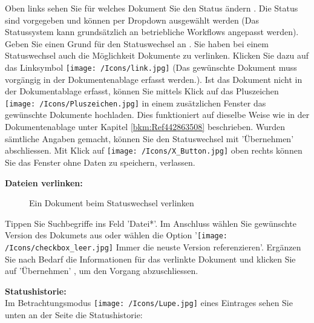 Oben links sehen Sie für welches Dokument Sie den Status ändern . Die Status sind vorgegeben und können per Dropdown ausgewählt werden  (Das Statussystem kann grundsätzlich an betriebliche Workflows angepasst werden). Geben Sie einen Grund für den Statuswechsel an . Sie haben bei einem Statuswechsel auch die Möglichkeit Dokumente zu verlinken. Klicken Sie dazu auf das Linksymbol \texttt{[image: /Icons/link.jpg]}  (Das gewünschte Dokument muss vorgängig in der Dokumentenablage erfasst werden.). Ist das Dokument nicht in der Dokumentablage erfasst, können Sie mittels Klick auf das Pluszeichen \texttt{[image: /Icons/Pluszeichen.jpg]}  in einem zusätzlichen Fenster das gewünschte Dokumente hochladen. Dies funktioniert auf dieselbe Weise wie in der Dokumentenablage unter Kapitel \ref{bkm:Ref442863508} beschrieben. Wurden sämtliche Angaben gemacht, können Sie den Statuswechsel mit 'Übernehmen'  abschliessen. Mit Klick auf \texttt{[image: /Icons/X\_Button.jpg]}  oben rechts können Sie das Fenster ohne Daten zu speichern, verlassen.

\vspace{\baselineskip}

\textbf{Dateien verlinken:}

\begin{figure}[H]
\caption{Ein Dokument beim Statuswechsel verlinken}
\end{figure}

Tippen Sie Suchbegriffe ins Feld 'Datei*'. Im Anschluss wählen Sie gewünschte Version des Dokumets aus oder wählen die Option '\texttt{[image: /Icons/checkbox\_leer.jpg]} Immer die neuste Version referenzieren'. Ergänzen Sie nach Bedarf die Informationen für das verlinkte Dokument und klicken Sie auf 'Übernehmen' , um den Vorgang abzuschliessen.

\vspace{\baselineskip}

\textbf{Statushistorie:}\\
Im Betrachtungsmodus \texttt{[image: /Icons/Lupe.jpg]} eines Eintrages sehen Sie unten an der Seite die Statushistorie:

